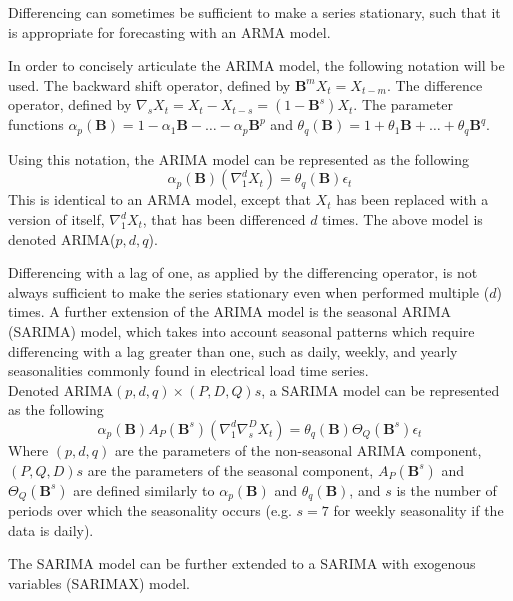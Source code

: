 Differencing can sometimes be sufficient to make a series stationary, such that it is appropriate for forecasting with an ARMA model.
\par
In order to concisely articulate the ARIMA model, the following notation will be used. The backward shift operator, defined by $\textbf{B}^{m}X_{t} = X_{t-m}$. The difference operator, defined by $\nabla_{s} X_{t} = X_{t} - X_{t-s} = (1 - \textbf{B}^{s})X_{t}$. The parameter functions $\alpha_{p}(\textbf{B}) = 1 - \alpha_{1}\textbf{B} - \ldots - \alpha_{p}\textbf{B}^p$ and $\theta_{q}(\textbf{B}) = 1 + \theta_{1}\textbf{B} + \ldots + \theta_{q}\textbf{B}^q$.
\par
Using this notation, the ARIMA model can be represented as the following
\begin{equation}
\alpha_{p}(\textbf{B})(\nabla_{1}^{d}X_{t}) = \theta_{q}(\textbf{B})\epsilon_{t}
\end{equation}
This is identical to an ARMA model, except that $X_{t}$ has been replaced with a  version of itself, $\nabla_{1}^{d}X_{t}$, that has been differenced $d$ times.
The above model is denoted ARIMA($p,d,q$).
\par
Differencing with a lag of one, as applied by the differencing operator, is not always sufficient to make the series stationary even when performed multiple ($d$) times.
A further extension of the ARIMA model is the seasonal ARIMA (SARIMA) model, which takes into account seasonal patterns which require differencing with a lag greater than one, such as daily, weekly, and yearly seasonalities commonly found in electrical load time series.
\\
Denoted ARIMA$(p,d,q)\times(P,D,Q)s$, a SARIMA model can be represented as the following
\begin{equation}
\alpha_{p}(\textbf{B})A_{P}(\textbf{B}^{s})(\nabla_{1}^{d}\nabla_{s}^{D}X_{t}) = \theta_{q}(\textbf{B})\Theta_{Q}(\textbf{B}^{s})\epsilon_{t}
\end{equation}
Where $(p,d,q)$ are the parameters of the non-seasonal ARIMA component, $(P,Q,D)s$ are the parameters of the seasonal component, $A_{P}(\textbf{B}^{s})$ and $\Theta_{Q}(\textbf{B}^{s})$ are defined similarly to $\alpha_{p}(\textbf{B})$ and $\theta_{q}(\textbf{B})$, and $s$ is the number of periods over which the seasonality occurs (e.g. $s=7$ for weekly seasonality if the data is daily).
\par
The SARIMA model can be further extended to a SARIMA with exogenous variables (SARIMAX) model.

